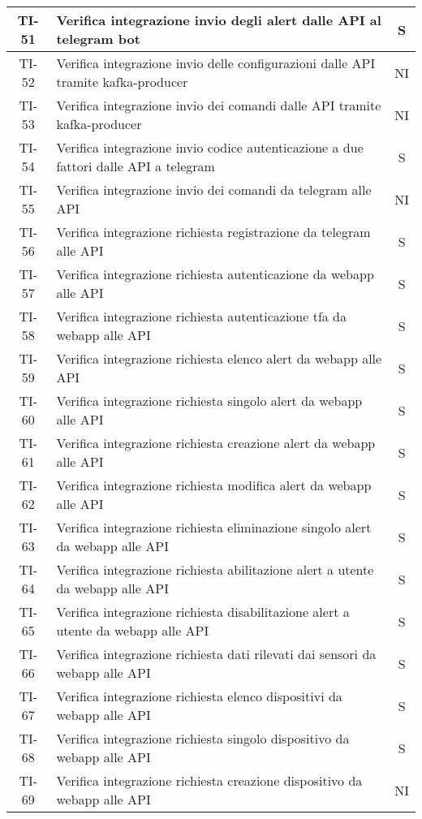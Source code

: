 \begin{center}
\begin{longtable}{|c|p{12cm}|c|}
			\hline
			TI-51 & Verifica integrazione invio degli alert dalle API al telegram bot & S \\
			\hline
			TI-52 & Verifica integrazione invio delle configurazioni dalle API tramite kafka-producer & NI \\
			\hline
			TI-53 & Verifica integrazione invio dei comandi dalle API tramite kafka-producer & NI \\
			\hline
			TI-54 & Verifica integrazione invio codice autenticazione a due fattori dalle API a telegram & S \\
			\hline
			TI-55 & Verifica integrazione invio dei comandi da telegram alle API & NI \\
			\hline
			TI-56 & Verifica integrazione richiesta registrazione da telegram alle API & S \\
			\hline
			TI-57 & Verifica integrazione richiesta autenticazione da webapp alle API & S \\
			\hline
			TI-58 & Verifica integrazione richiesta autenticazione tfa da webapp alle API & S \\
			\hline
			TI-59 & Verifica integrazione richiesta elenco alert da webapp alle API & S \\
			\hline
			TI-60 & Verifica integrazione richiesta singolo alert da webapp alle API & S \\
			\hline
			TI-61 & Verifica integrazione richiesta creazione alert da webapp alle API & S \\
			\hline
			TI-62 & Verifica integrazione richiesta modifica alert da webapp alle API & S \\
			\hline
			TI-63 & Verifica integrazione richiesta eliminazione singolo alert da webapp alle API & S \\
			\hline
			TI-64 & Verifica integrazione richiesta abilitazione alert a utente da webapp alle API & S \\
			\hline
			TI-65 & Verifica integrazione richiesta disabilitazione alert a utente da webapp alle API & S \\
			\hline
			TI-66 & Verifica integrazione richiesta dati rilevati dai sensori da webapp alle API & S \\
			\hline
			TI-67 & Verifica integrazione richiesta elenco dispositivi da webapp alle API & S \\
			\hline
			TI-68 & Verifica integrazione richiesta singolo dispositivo da webapp alle API & S \\
			\hline
			TI-69 & Verifica integrazione richiesta creazione dispositivo da webapp alle API & NI \\

\end{longtable}
\end{center}
